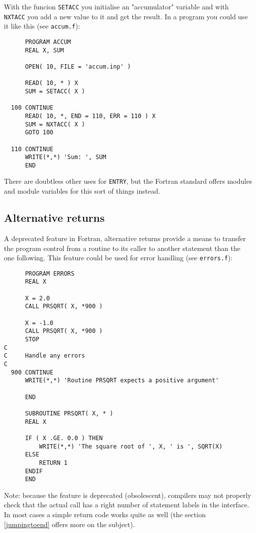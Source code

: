 With the funcion \verb+SETACC+ you initialise an "accumulator" variable and with \verb+NXTACC+
you add a new value to it and get the result. In a program you could use it like this (see \verb+accum.f+):
\begin{verbatim}
      PROGRAM ACCUM
      REAL X, SUM

      OPEN( 10, FILE = 'accum.inp' )

      READ( 10, * ) X
      SUM = SETACC( X )

  100 CONTINUE
      READ( 10, *, END = 110, ERR = 110 ) X
      SUM = NXTACC( X )
      GOTO 100

  110 CONTINUE
      WRITE(*,*) 'Sum: ', SUM
      END
\end{verbatim}

There are doubtless other uses for \verb+ENTRY+, but the Fortran standard offers modules and module
variables for this sort of things instead.


\subsection{Alternative returns}
A deprecated feature in Fortran, alternative returns provide a means to
transfer the program control from a routine to its caller to another
statement than the one following. This feature could be used for
error handling (see \verb+errors.f+):
\begin{verbatim}
      PROGRAM ERRORS
      REAL X

      X = 2.0
      CALL PRSQRT( X, *900 )

      X = -1.0
      CALL PRSQRT( X, *900 )
      STOP
C
C     Handle any errors
C
  900 CONTINUE
      WRITE(*,*) 'Routine PRSQRT expects a positive argument'

      END

      SUBROUTINE PRSQRT( X, * )
      REAL X

      IF ( X .GE. 0.0 ) THEN
          WRITE(*,*) 'The square root of ', X, ' is ', SQRT(X)
      ELSE
          RETURN 1
      ENDIF
      END
\end{verbatim}

Note: because the feature is deprecated (obsolescent), compilers may not properly check that
the actual call has a right number of statement labels in the interface. In most cases
a simple return code works quite as well (the section \ref{jumpingtoend} offers more
on the subject).

